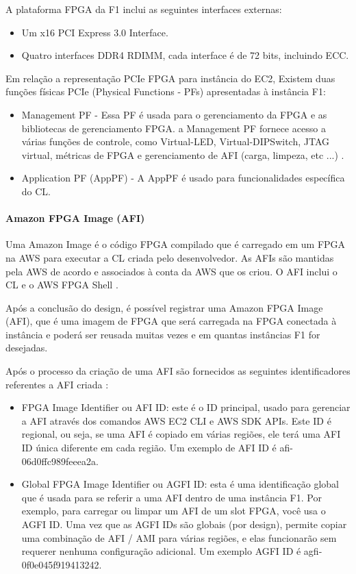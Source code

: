 A plataforma FPGA da F1 inclui as seguintes interfaces externas:

\begin{itemize}
    \item Um x16 PCI Express 3.0 Interface.
    \item 
Quatro interfaces DDR4 RDIMM, cada interface é de 72 bits, incluindo ECC.
\end{itemize}
 
Em relação a representação PCIe FPGA para instância do EC2, Existem duas funções físicas PCIe (Physical Functions - PFs) apresentadas à instância F1:

\begin{itemize}
    \item Management PF - Essa PF é usada para o gerenciamento da FPGA e as bibliotecas de gerenciamento FPGA. a Management PF fornece acesso a várias funções de controle, como Virtual-LED, Virtual-DIPSwitch, JTAG virtual, métricas de FPGA e gerenciamento de AFI (carga, limpeza, etc ...) \cite{awsshell}.
    
    \item Application PF (AppPF) - A AppPF é usado para funcionalidades específica do CL.
\end{itemize}

\paragraph{Amazon FPGA Image (AFI)} \label{sec:afi}
 
 Uma Amazon Image é o código FPGA compilado que é carregado em um FPGA na AWS para executar a CL criada pelo desenvolvedor. As AFIs são mantidas pela AWS de acordo e associados à conta da AWS que os criou. O AFI inclui o CL e o AWS FPGA Shell \cite{awsfaq}.
 
 Após a conclusão do design, é possível registrar uma Amazon FPGA Image (AFI), que é uma imagem de FPGA que será carregada na FPGA conectada à instância e poderá ser reusada muitas vezes e em quantas instâncias F1 for desejadas.  

Após o processo da criação de uma AFI são fornecidos as seguintes identificadores referentes a AFI criada :
\begin{itemize}

\item FPGA Image Identifier ou AFI ID: este é o ID principal, usado para gerenciar a AFI através dos comandos AWS EC2 CLI e AWS SDK APIs. Este ID é regional, ou seja, se uma AFI é copiado em várias regiões, ele terá uma  AFI ID única diferente em cada região. Um exemplo de AFI ID é afi-06d0ffc989feeea2a. 

\item Global FPGA Image Identifier ou AGFI ID: esta é uma identificação global que é usada para se referir a uma AFI dentro de uma instância F1. Por exemplo, para carregar ou limpar um AFI de um slot FPGA, você usa o AGFI ID. Uma vez que as  AGFI  IDs são globais (por design), permite copiar uma combinação de AFI / AMI para várias regiões, e elas funcionarão sem requerer nenhuma configuração adicional. Um exemplo AGFI ID é agfi-0f0e045f919413242.

\end{itemize}


